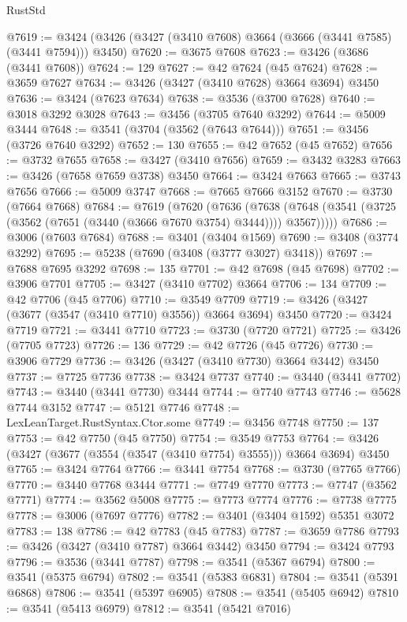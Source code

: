 \begin{lexlean}{RustStd}
\begin{coremodule}
@7619 := @3424 (@3426 (@3427 (@3410 @7608) @3664 (@3666 (@3441 @7585) (@3441 @7594))) @3450)
@7620 := @3675 @7608
@7623 := @3426 (@3686 (@3441 @7608))
@7624 := 129
@7627 := @42 @7624 (@45 @7624)
@7628 := @3659 @7627
@7634 := @3426 (@3427 (@3410 @7628) @3664 @3694) @3450
@7636 := @3424 (@7623 @7634)
@7638 := @3536 (@3700 @7628)
@7640 := @3018 @3292 @3028
@7643 := @3456 (@3705 @7640 @3292)
@7644 := @5009 @3444
@7648 := @3541 (@3704 (@3562 (@7643 @7644)))
@7651 := @3456 (@3726 @7640 @3292)
@7652 := 130
@7655 := @42 @7652 (@45 @7652)
@7656 := @3732 @7655
@7658 := @3427 (@3410 @7656)
@7659 := @3432 @3283
@7663 := @3426 (@7658 @7659 @3738) @3450
@7664 := @3424 @7663
@7665 := @3743 @7656
@7666 := @5009 @3747
@7668 := @7665 @7666 @3152
@7670 := @3730 (@7664 @7668)
@7684 := @7619
    (@7620
      (@7636
        (@7638 (@7648 (@3541 (@3725 (@3562 (@7651 (@3440 (@3666 @7670 @3754) @3444)))) @3567)))))
@7686 := @3006 (@7603 @7684)
@7688 := @3401 (@3404 @1569)
@7690 := @3408 (@3774 @3292)
@7695 := @5238 (@7690 (@3408 (@3777 @3027) @3418))
@7697 := @7688 @7695 @3292
@7698 := 135
@7701 := @42 @7698 (@45 @7698)
@7702 := @3906 @7701
@7705 := @3427 (@3410 @7702) @3664
@7706 := 134
@7709 := @42 @7706 (@45 @7706)
@7710 := @3549 @7709
@7719 := @3426 (@3427 (@3677 (@3547 (@3410 @7710) @3556)) @3664 @3694) @3450
@7720 := @3424 @7719
@7721 := @3441 @7710
@7723 := @3730 (@7720 @7721)
@7725 := @3426 (@7705 @7723)
@7726 := 136
@7729 := @42 @7726 (@45 @7726)
@7730 := @3906 @7729
@7736 := @3426 (@3427 (@3410 @7730) @3664 @3442) @3450
@7737 := @7725 @7736
@7738 := @3424 @7737
@7740 := @3440 (@3441 @7702)
@7743 := @3440 (@3441 @7730) @3444
@7744 := @7740 @7743
@7746 := @5628 @7744 @3152
@7747 := @5121 @7746
@7748 := LexLeanTarget.RustSyntax.Ctor.some
@7749 := @3456 @7748
@7750 := 137
@7753 := @42 @7750 (@45 @7750)
@7754 := @3549 @7753
@7764 := @3426 (@3427 (@3677 (@3554 (@3547 (@3410 @7754) @3555))) @3664 @3694) @3450
@7765 := @3424 @7764
@7766 := @3441 @7754
@7768 := @3730 (@7765 @7766)
@7770 := @3440 @7768 @3444
@7771 := @7749 @7770
@7773 := @7747 (@3562 @7771)
@7774 := @3562 @5008
@7775 := @7773 @7774
@7776 := @7738 @7775
@7778 := @3006 (@7697 @7776)
@7782 := @3401 (@3404 @1592) @5351 @3072
@7783 := 138
@7786 := @42 @7783 (@45 @7783)
@7787 := @3659 @7786
@7793 := @3426 (@3427 (@3410 @7787) @3664 @3442) @3450
@7794 := @3424 @7793
@7796 := @3536 (@3441 @7787)
@7798 := @3541 (@5367 @6794)
@7800 := @3541 (@5375 @6794)
@7802 := @3541 (@5383 @6831)
@7804 := @3541 (@5391 @6868)
@7806 := @3541 (@5397 @6905)
@7808 := @3541 (@5405 @6942)
@7810 := @3541 (@5413 @6979)
@7812 := @3541 (@5421 @7016)

\end{coremodule}
\end{lexlean}
